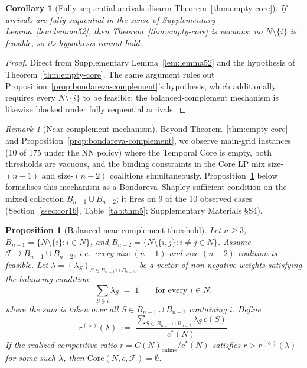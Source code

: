 \documentclass[11pt]{article}
\theoremstyle{plain}
\newtheorem{corollary}[theorem]{Corollary}
\newtheorem{proposition}[theorem]{Proposition}
\theoremstyle{definition}
\theoremstyle{remark}
\newtheorem{remark}[theorem]{Remark}
\newcommand{\F}{\mathcal{F}}
\newcommand{\cstar}{c^{\ast}}
\begin{document}
\begin{corollary}[Fully sequential arrivals disarm Theorem~\ref{thm:empty-core}]
\label{cor:cor51}
If arrivals are fully sequential in the sense of Supplementary Lemma~\ref{lem:lemma52}, then Theorem~\ref{thm:empty-core} is vacuous: no $N\setminus\{i\}$ is feasible, so its hypothesis cannot hold.
\end{corollary}

\begin{proof}
Direct from Supplementary Lemma~\ref{lem:lemma52} and the hypothesis of Theorem~\ref{thm:empty-core}. The same argument rules out Proposition~\ref{prop:bondareva-complement}'s hypothesis, which additionally requires every $N\setminus\{i\}$ to be feasible; the balanced-complement mechanism is likewise blocked under fully sequential arrivals.
\end{proof}

\begin{remark}[Near-complement mechanism]
\label{rem:near-complement}
Beyond Theorem~\ref{thm:empty-core} and Proposition~\ref{prop:bondareva-complement}, we observe main-grid instances (10 of 175 under the NN policy) where the Temporal Core is empty, both thresholds are vacuous, and the binding constraints in the Core LP mix size-$(n-1)$ and size-$(n-2)$ coalitions simultaneously. Proposition~\ref{prop:balanced-near-complement} below formalises this mechanism as a Bondareva--Shapley sufficient condition on the mixed collection $B_{n-1}\cup B_{n-2}$; it fires on 9 of the 10 observed cases (Section~\ref{ssec:cor16}, Table~\ref{tab:thm5}; Supplementary Materials \S S4).
\end{remark}

\begin{proposition}[Balanced-near-complement threshold]
\label{prop:balanced-near-complement}
Let $n\ge 3$, $B_{n-1}=\{N\setminus\{i\}:i\in N\}$, and $B_{n-2}=\{N\setminus\{i,j\}:i\neq j\in N\}$. Assume $\F\supseteq B_{n-1}\cup B_{n-2}$, i.e.\ every size-$(n-1)$ and size-$(n-2)$ coalition is feasible. Let $\lambda=(\lambda_S)_{S\in B_{n-1}\cup B_{n-2}}$ be a vector of non-negative weights satisfying the balancing condition
\[
\sum_{S\ni i}\lambda_S \;=\; 1 \qquad \text{for every } i\in N,
\]
where the sum is taken over all $S\in B_{n-1}\cup B_{n-2}$ containing $i$. Define
\[
r^{(\diamond)}(\lambda) \;:=\; \frac{\sum_{S\in B_{n-1}\cup B_{n-2}}\lambda_S\,c(S)}{\cstar(N)}.
\]
If the realized competitive ratio $r = C(N)_{\text{online}}/\cstar(N)$ satisfies $r>r^{(\diamond)}(\lambda)$ for some such $\lambda$, then $\mathrm{Core}(N,c,\F)=\emptyset$.
\end{proposition}
\end{document}
